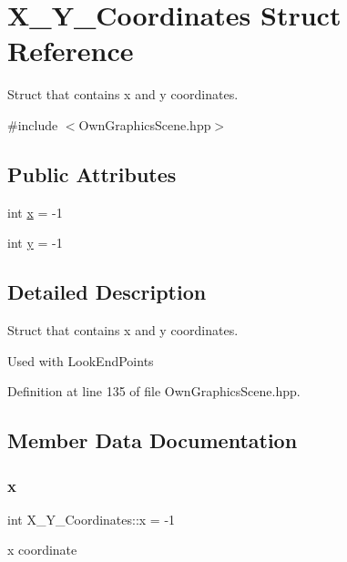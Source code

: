 \hypertarget{structX__Y__Coordinates}{}\section{X\+\_\+\+Y\+\_\+\+Coordinates Struct Reference}
\label{structX__Y__Coordinates}


Struct that contains x and y coordinates.  




{\ttfamily \#include $<$Own\+Graphics\+Scene.\+hpp$>$}

\subsection*{Public Attributes}
\begin{DoxyCompactItemize}
\item 
int \mbox{\hyperlink{structX__Y__Coordinates_a89f7ab800d6777b26a037e82501c6798}{x}} = -\/1
\item 
int \mbox{\hyperlink{structX__Y__Coordinates_a4a608b81d10b65d5b12596ca82df34f6}{y}} = -\/1
\end{DoxyCompactItemize}


\subsection{Detailed Description}
Struct that contains x and y coordinates. 

Used with Look\+End\+Points 

Definition at line 135 of file Own\+Graphics\+Scene.\+hpp.



\subsection{Member Data Documentation}
\mbox{\label{structX__Y__Coordinates_a89f7ab800d6777b26a037e82501c6798}} 
\subsubsection{\texorpdfstring{x}{x}}
{\footnotesize\ttfamily int X\+\_\+\+Y\+\_\+\+Coordinates\+::x = -\/1}

x coordinate 

